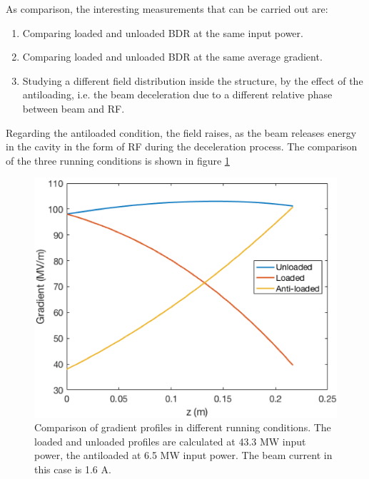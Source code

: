 As comparison, the interesting measurements that can be carried out are:
\begin{enumerate}
\item Comparing  loaded and unloaded BDR at the same input power.
\item Comparing  loaded and unloaded BDR at the same average gradient.
\item Studying a different field distribution inside the structure, by the effect of the antiloading, i.e. the beam deceleration due to a different relative phase between beam and RF.
\end{enumerate}
Regarding the antiloaded condition, the field raises, as the beam releases energy in the cavity in the form of RF during the deceleration process. The comparison of the three running conditions is shown in figure \ref{3grad}

\begin{figure}[h]
\centering 
\includegraphics[scale=1]{pictures/3gradient.png}
\caption{Comparison of gradient profiles in different running conditions. The loaded and unloaded profiles are calculated at 43.3 MW input power, the antiloaded at 6.5 MW input power. The beam current in this case is 1.6 A.}
\label{3grad}
\end{figure}